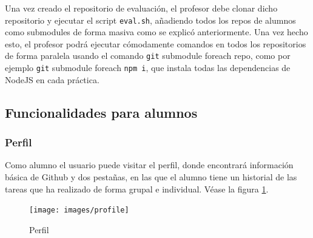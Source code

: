Una vez creado el repositorio de evaluación, el profesor debe clonar dicho repositorio y ejecutar el script \verb|eval.sh|, añadiendo todos los repos de alumnos como submodules de forma masiva como se explicó anteriormente. Una vez hecho esto, el profesor podrá ejecutar cómodamente comandos en todos los repositorios de forma paralela usando el comando \verb|git| submodule foreach repo, como por ejemplo \verb|git| submodule foreach \verb|npm i|, que instala todas las dependencias de NodeJS en cada práctica.

\newpage 

\subsection{Funcionalidades para alumnos}
\label{3:6:3}

\subsubsection{Perfil}

Como alumno el usuario puede visitar el perfil, donde encontrará información básica de Github y dos pestañas, en las que el alumno tiene un historial de las tareas que ha realizado de forma grupal e individual.
Véase la figura \ref{fig:Perfil}.

\begin{figure}[!th]
\begin{center}
\texttt{[image: images/profile]}
\caption{Perfil}
\label{fig:Perfil}
\end{center}
\end{figure}

